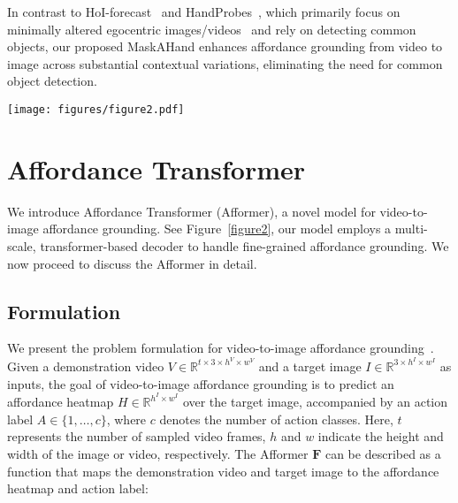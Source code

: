 \documentclass[10pt,twocolumn,letterpaper]{article}
\begin{document}
In contrast to HoI-forecast~\cite{jointhand} and HandProbes~\cite{probes}, which primarily focus on minimally altered egocentric images/videos~\cite{egovlp} and rely on detecting common objects, our proposed MaskAHand enhances affordance grounding from video to image across substantial contextual variations, eliminating the need for common object detection.

\begin{figure*}[t]
    \centering
    \texttt{[image: figures/figure2.pdf]}
    \caption{Our proposed Afformer is a simple yet effective model for video-to-image affordance grounding. The Afformer takes a demonstration video and a target image as inputs and produces an affordance heatmap on the target image. It employs an encoder to extract video and image features, followed by a multi-scale, transformer-based decoder to progressively refine fine-grained affordance heatmaps.}
    \label{figure2}
\end{figure*}

\section{Affordance Transformer}

We introduce Affordance Transformer (Afformer), a novel model for video-to-image affordance grounding. See Figure~\ref{figure2}, our model employs a multi-scale, transformer-based decoder to handle fine-grained affordance grounding. We now proceed to discuss the Afformer in detail.

\subsection{Formulation} \label{section3.1}

We present the problem formulation for video-to-image affordance grounding~\cite{demo2vec}. Given a demonstration video $V \in \mathbb{R}^{t\times 3 \times h^V \times w^V}$ and a target image $I \in \mathbb{R}^{3 \times h^I \times w^I}$ as inputs, the goal of video-to-image affordance grounding is to predict an affordance heatmap $H \in \mathbb{R}^{h^I \times w^I}$ over the target image, accompanied by an action label $A \in \{1, \ldots, c\}$, where $c$ denotes the number of action classes. Here, $t$ represents the number of sampled video frames, $h$ and $w$ indicate the height and width of the image or video, respectively. The Afformer $\boldsymbol{F}$ can be described as a function that maps the demonstration video and target image to the affordance heatmap and action label:
\end{document}
